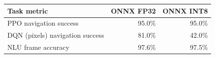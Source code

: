 \begin{tabular}{lrr}
\toprule
Task metric & ONNX FP32 & ONNX INT8 \\
\midrule
PPO navigation success & 95.0\% & 95.0\% \\
DQN (pixels) navigation success & 81.0\% & 42.0\% \\
NLU frame accuracy & 97.6\% & 97.5\% \\
\bottomrule
\end{tabular}
